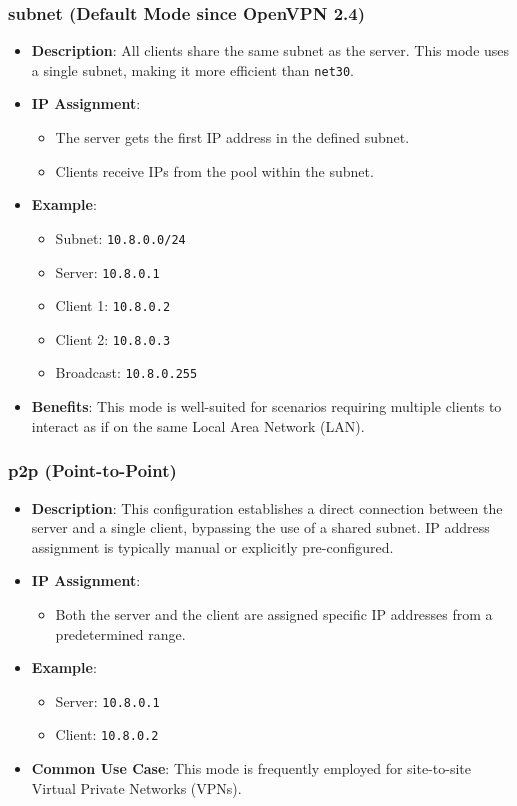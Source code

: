 \subsubsection{subnet (Default Mode since OpenVPN 2.4)}
\begin{itemize}
    \item \textbf{Description}: All clients share the same subnet as the server. This mode uses a single subnet, making it more efficient than \texttt{net30}.
\item \textbf{IP Assignment}:
\begin{itemize}
        \item The server gets the first IP address in the defined subnet.
        \item Clients receive IPs from the pool within the subnet.
\end{itemize}
\item \textbf{Example}:
\begin{itemize}
\item Subnet: \texttt{10.8.0.0/24}
\item Server: \texttt{10.8.0.1}
\item Client 1: \texttt{10.8.0.2}
\item Client 2: \texttt{10.8.0.3}
\item Broadcast: \texttt{10.8.0.255}
\end{itemize}
\item \textbf{Benefits}: This mode is well-suited for scenarios requiring multiple clients to interact as if on the same Local Area Network (LAN).
\end{itemize}

\subsubsection{p2p (Point-to-Point)}
\begin{itemize}
\item \textbf{Description}: This configuration establishes a direct connection between the server and a single client, bypassing the use of a shared subnet. IP address assignment is typically manual or explicitly pre-configured.
\item \textbf{IP Assignment}:
\begin{itemize}
\item Both the server and the client are assigned specific IP addresses from a predetermined range.
\end{itemize}
\item \textbf{Example}:
\begin{itemize}
\item Server: \texttt{10.8.0.1}
\item Client: \texttt{10.8.0.2}
\end{itemize}
\item \textbf{Common Use Case}: This mode is frequently employed for site-to-site Virtual Private Networks (VPNs).
\end{itemize}

